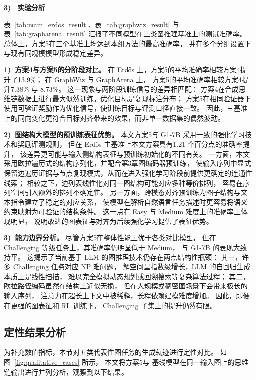 \textbf{3) \ 实验分析}

表~\ref{tab:main_erdos_result}、表~\ref{tab:graphwiz_result} 与
表~\ref{tab:grapharena_result}
汇报了不同模型在三类图推理基准上的测试准确率。
总体上，方案5在三个基准上均达到本组方法的最高准确率，
并在多个分组设置下与现有同规模模型形成稳定差异。

\textbf{1)\ 方案4与方案5的分阶段对比。}
在 Erd\H{o}s\cite{Guo2025G1TL} 上，方案5的平均准确率相较方案4提升了13.9\%；
在 GraphWiz\cite{Chen2024GraphWizAI} 与 GraphArena\cite{Tang2024GraphArenaBL} 上，
方案5的平均准确率相较方案4提升7.38\% 与 8.73\%。
这一现象与两阶段训练信号的差异相匹配：
方案4在合成思维链数据上进行最大似然训练，优化目标是复现标注分布；
方案5在相同验证器下使用可验证奖励作为优化信号，使训练目标与评测口径直接一致。
因此，三基准上的同向变化更符合目标对齐带来的效果，而非单一数据集的偶然波动。

\textbf{2)\ 图结构大模型的预训练表征优势。}
本文方案5与 G1-7B 采用一致的强化学习技术和奖励评测规则，
但在 Erd\H{o}s\cite{Guo2025G1TL}  主基准上本文方案具有1.21 个百分点的准确率提升，
该差异更可能与输入侧结构表征与预训练初始化的不同有关。
一方面，本文采用欧拉遍历式的结构序列化，并配合第3章图编码器预训练，
使输入序列中显式保留边遍历证据与节点复现模式，从而在进入强化学习阶段前提供更确定的连通性线索；
相较之下，边列表线性化对同一图结构可能对应多种等价排列，
容易在序列空间引入额外的排列不确定性。
另一方面，跨模态对齐预训练为图子结构与文本指令建立了稳定的对应关系，
使模型在解析自然语言任务描述时更容易将语义约束映射为可验证的结构条件。
这一点在 Easy 与 Medium 难度上的准确率上体现明显，
说明改进的图表征与对齐为后续强化学习提供了表征优势。

\textbf{3)\ 能力边界分析。}
尽管方案5在整体性能上优于各类对比模型，
但在 Challenging 等级任务上，其准确率仍明显低于 Medium，
与 G1-7B 的表现大致持平。
这揭示了当前基于 LLM 的图推理技术仍存在两点结构性瓶颈：
其一，许多 Challenging 任务对应 NP 难问题，
解空间呈指数级增长，LLM 的自回归生成本质上是线性扫描，
难以完全模拟动态规划或回溯搜索等复杂算法过程；
其二，欧拉路径编码虽然在结构上近似无损，
但在大规模或稠密图场景下会带来极长的输入序列，
注意力在超长上下文中被稀释，长程依赖建模难度增加。
因此，即便在更强的图表征和 RL 训练下，
Challenging 子集上的提升仍然有限。

\subsection{定性结果分析}
\label{subsec:qualitative_analysis}

为补充数值指标，本节对五类代表性图任务的生成轨迹进行定性对比。
如图~\ref{fig:qualitative_cases} 所示，
本文将方案5与
基线模型在同一输入图上的思维链输出进行并列分析，观察到以下结果。

